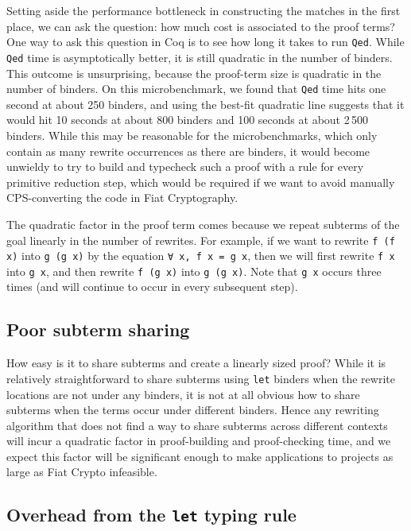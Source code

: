 \documentclass[a4paper,USenglish,cleveref,autoref,thm-restate]{lipics-v2021}
\begin{document}
\begin{minipage}[t][1cm]{\textwidth}
Setting aside the performance bottleneck in constructing the matches in the first place, we can ask the question: how much cost is associated to the proof terms?
One way to ask this question in Coq is to see how long it takes to run \texttt{Qed}.
While \texttt{Qed} time is asymptotically better, it is still quadratic in the number of binders.
This outcome is unsurprising, because the proof-term size is quadratic in the number of binders.
On this microbenchmark, we found that \texttt{Qed} time hits one second at about 250 binders, and using the best-fit quadratic line suggests that it would hit 10 seconds at about 800 binders and 100 seconds at about 2\,500 binders.
While this may be reasonable for the microbenchmarks, which only contain as many rewrite occurrences as there are binders, it would become unwieldy to try to build and typecheck such a proof with a rule for every primitive reduction step, which would be required if we want to avoid manually CPS-converting the code in Fiat Cryptography.

The quadratic factor in the proof term comes because we repeat subterms of the goal linearly in the number of rewrites.
For example, if we want to rewrite \texttt{f (f x)} into \texttt{g (g x)} by the equation \texttt{∀ x, f x = g x}, then we will first rewrite \texttt{f x} into \texttt{g x}, and then rewrite \texttt{f (g x)} into \texttt{g (g x)}.
Note that \texttt{g x} occurs three times (and will continue to occur in every subsequent step).

\subsection{Poor subterm sharing}

How easy is it to share subterms and create a linearly sized proof?
While it is relatively straightforward to share subterms using \texttt{let} binders when the rewrite locations are not under any binders, it is not at all obvious how to share subterms when the terms occur under different binders.
Hence any rewriting algorithm that does not find a way to share subterms across different contexts will incur a quadratic factor in proof-building and proof-checking time, and we expect this factor will be significant enough to make applications to projects as large as Fiat Crypto infeasible.

\subsection{Overhead from the \texttt{let} typing rule}


\end{minipage}
\end{document}
